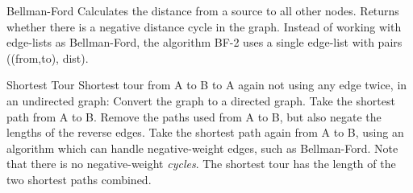 
\begin{algorithm}{Bellman-Ford}
\desc
Calculates the distance from a source to all other nodes.
Returns whether there is a negative distance cycle in the graph.
Instead of working with edge-lists as Bellman-Ford, the algorithm BF-2 uses
a single edge-list with pairs ((from,to), dist).
\end{algorithm}


\begin{algorithm}{Shortest Tour}
\desc
Shortest tour from A to B to A again not using any edge twice, in an
undirected graph: Convert the graph to a directed graph.  Take the
shortest path from A to B.  Remove the paths used from A to B, but
also negate the lengths of the reverse edges.  Take the shortest path
again from A to B, using an algorithm which can handle negative-weight
edges, such as Bellman-Ford. Note that there is no negative-weight
\emph{cycles}.  The shortest tour has the length of the two shortest
paths combined. 
\end{algorithm}
